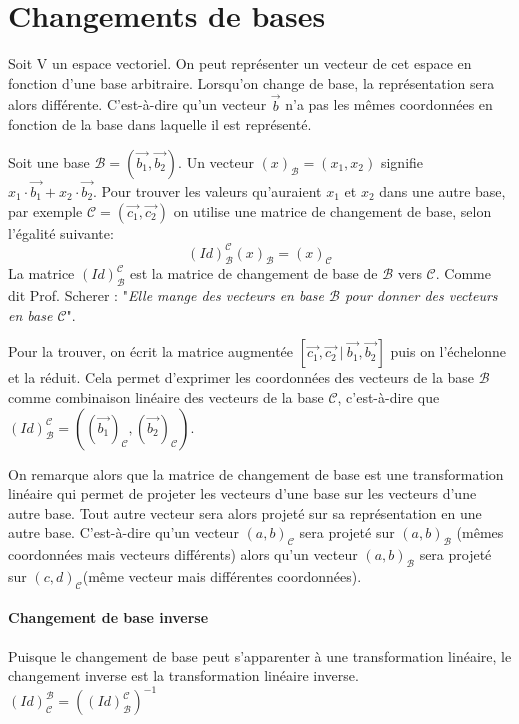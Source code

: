 \documentclass[10pt,a4paper]{book}
\begin{document}
\section{Changements de bases}
Soit V un espace vectoriel. On peut représenter un vecteur de cet espace en fonction d'une base arbitraire. Lorsqu'on change de base, la représentation sera alors différente. C'est-à-dire qu'un vecteur $\vec{b}$ n'a pas les mêmes coordonnées en fonction de la base dans laquelle il est représenté. \par 
Soit une base $\mathcal{B}=(\vec{b_1}, \vec{b_2})$. Un vecteur $(x)_{\mathcal{B}}=(x_1,x_2)$ signifie $x_1\cdot \vec{b_1}+x_2\cdot \vec{b_2}$. Pour trouver les valeurs qu'auraient $x_1$ et $x_2$ dans une autre base, par exemple $\mathcal{C}=(\vec{c_1}, \vec{c_2})$ on utilise une matrice de changement de base, selon l'égalité suivante: 
\[(Id)^{\mathcal{C}}_{\mathcal{B}} (x)_{\mathcal{B}} = (x)_{\mathcal{C}}\]
La matrice $(Id)^{\mathcal{C}}_{\mathcal{B}}$ est la matrice de changement de base de $\mathcal{B}$ vers $\mathcal{C}$. Comme dit Prof. Scherer : "\textit{Elle mange des vecteurs en base $\mathcal{B}$ pour donner des vecteurs en base $\mathcal{C}$}". \par 
Pour la trouver, on écrit la matrice augmentée $[\vec{c_1},\vec{c_2}\ |\ \vec{b_1},\vec{b_2}]$ puis on l'échelonne et la réduit. Cela permet d'exprimer les coordonnées des vecteurs de la base $\mathcal{B}$ comme combinaison linéaire des vecteurs de la base $\mathcal{C}$, c'est-à-dire que $(Id)^{\mathcal{C}}_{\mathcal{B}} = ((\vec{b_1})_{\mathcal{C}},(\vec{b_2})_{\mathcal{C}})$.\par 
On remarque alors que la matrice de changement de base est une transformation linéaire qui permet de projeter les vecteurs d'une base sur les vecteurs d'une autre base. Tout autre vecteur sera alors projeté sur sa représentation en une autre base. C'est-à-dire qu'un vecteur $(a,b)_\mathcal{C}$ sera projeté sur $(a,b)_\mathcal{B}$ (mêmes coordonnées mais vecteurs différents) alors qu'un vecteur $(a,b)_\mathcal{B}$ sera projeté sur $(c,d)_\mathcal{C}$(même vecteur mais différentes coordonnées). 

\paragraph{Changement de base inverse}
Puisque le changement de base peut s'appa\-renter à une transformation linéaire, le changement inverse est la transformation linéaire inverse. $(Id)^{\mathcal{B}}_{\mathcal{C}} = ((Id)^{\mathcal{C}}_{\mathcal{B}})^{-1}$
\end{document}
